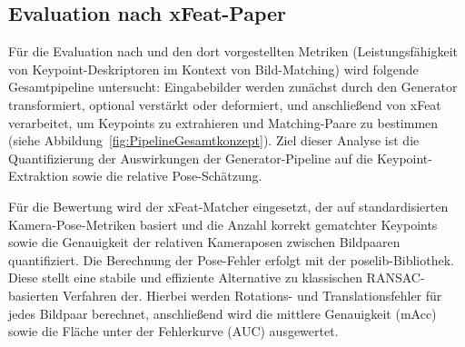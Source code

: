 


\subsection{Evaluation nach xFeat-Paper}
\label{subsec:Eval_xFeat_ImageNet256}
Für die Evaluation nach \textcite{potje2024xfeat} und den dort vorgestellten Metriken (Leistungsfähigkeit von Keypoint-Deskriptoren im Kontext von Bild-Matching) wird folgende Gesamtpipeline untersucht: Eingabebilder werden zunächst durch den Generator transformiert, optional verstärkt oder deformiert, und anschließend von \ac{xFeat} verarbeitet, um Keypoints zu extrahieren und Matching-Paare zu bestimmen (siehe Abbildung~\ref{fig:PipelineGesamtkonzept}).
Ziel dieser Analyse ist die Quantifizierung der Auswirkungen der Generator-Pipeline auf die Keypoint-Extraktion sowie die relative Pose-Schätzung.

Für die Bewertung wird der \ac{xFeat}-Matcher eingesetzt, der auf standardisierten Kamera-Pose-Metriken basiert und die Anzahl korrekt gematchter Keypoints sowie die Genauigkeit der relativen Kameraposen zwischen Bildpaaren quantifiziert. Die Berechnung der Pose-Fehler erfolgt mit der poselib-Bibliothek. Diese stellt eine stabile und effiziente Alternative zu klassischen \ac{RANSAC}-basierten Verfahren der. Hierbei werden Rotations- und Translationsfehler für jedes Bildpaar berechnet, anschließend wird die mittlere Genauigkeit (\ac{mAcc}) sowie die Fläche unter der Fehlerkurve (\ac{AUC}) ausgewertet.


